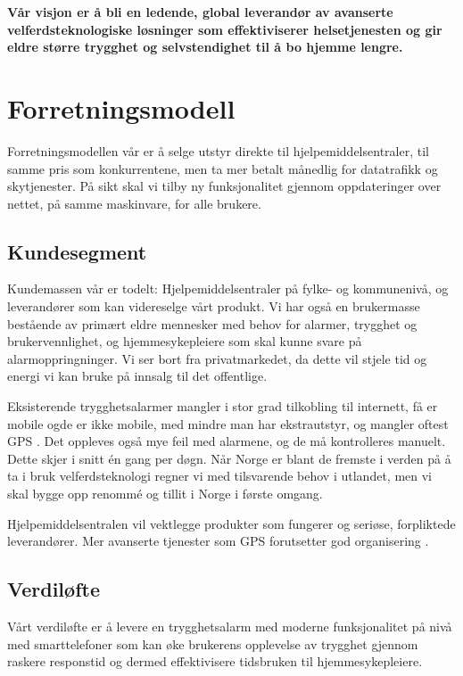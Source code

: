 \textbf{Vår visjon er å bli en ledende, global leverandør av avanserte
velferdsteknologiske løsninger som effektiviserer helsetjenesten og gir eldre
større trygghet og selvstendighet til å bo hjemme lengre.}

\clearpage

\section{Forretningsmodell}

Forretningsmodellen vår er å selge utstyr direkte til hjelpemiddelsentraler,
til samme pris som konkurrentene, men ta mer betalt månedlig for datatrafikk og
skytjenester.  På sikt skal vi tilby ny funksjonalitet gjennom oppdateringer
over nettet, på samme maskinvare, for alle brukere.

\subsection{Kundesegment}

Kundemassen vår er todelt: Hjelpemiddelsentraler på fylke- og kommunenivå, og
leverandører som kan videreselge vårt produkt.  Vi har også en brukermasse
bestående av primært eldre mennesker med behov for alarmer, trygghet og
brukervennlighet, og hjemmesykepleiere som skal kunne svare på
alarmoppringninger.  Vi ser bort fra privatmarkedet, da dette vil stjele tid og
energi vi kan bruke på innsalg til det offentlige.

Eksisterende trygghetsalarmer mangler i stor grad tilkobling til internett, få
er mobile ogde er ikke mobile, med mindre man har ekstrautstyr, og mangler
oftest GPS \cite{sverige.alarm}.  Det oppleves også mye feil med alarmene,
og de må kontrolleres manuelt. Dette skjer i snitt én gang per døgn. Når Norge
er blant de fremste i verden på å ta i bruk velferdsteknologi
\cite{telenor.undersokelse} regner vi med tilsvarende behov i utlandet, men vi
skal bygge opp renommé og tillit i Norge i første omgang.

Hjelpemiddelsentralen vil vektlegge produkter som fungerer og seriøse,
forpliktede leverandører. Mer avanserte tjenester som GPS forutsetter god
organisering \cite{org.alarmmottak}.

\subsection{Verdiløfte}

Vårt verdiløfte er å levere en trygghetsalarm med moderne funksjonalitet på
nivå med smarttelefoner som kan øke brukerens opplevelse av trygghet gjennom
raskere responstid og dermed effektivisere tidsbruken til hjemmesykepleiere.

